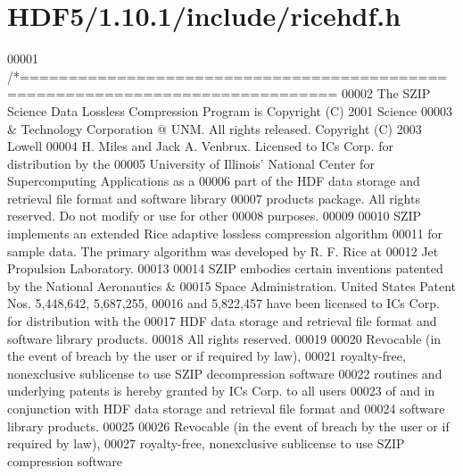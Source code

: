 \hypertarget{_h_d_f5_21_810_81_2include_2ricehdf_8h_source}{}\section{H\+D\+F5/1.10.1/include/ricehdf.h}
\label{_h_d_f5_21_810_81_2include_2ricehdf_8h_source}

\begin{DoxyCode}
00001 \textcolor{comment}{/*==============================================================================}
00002 \textcolor{comment}{The SZIP Science Data Lossless Compression Program is Copyright (C) 2001 Science}
00003 \textcolor{comment}{& Technology Corporation @ UNM.  All rights released.  Copyright (C) 2003 Lowell}
00004 \textcolor{comment}{H. Miles and Jack A. Venbrux.  Licensed to ICs Corp. for distribution by the}
00005 \textcolor{comment}{University of Illinois' National Center for Supercomputing Applications as a}
00006 \textcolor{comment}{part of the HDF data storage and retrieval file format and software library}
00007 \textcolor{comment}{products package.  All rights reserved.  Do not modify or use for other}
00008 \textcolor{comment}{purposes.}
00009 \textcolor{comment}{}
00010 \textcolor{comment}{SZIP implements an extended Rice adaptive lossless compression algorithm}
00011 \textcolor{comment}{for sample data.  The primary algorithm was developed by R. F. Rice at}
00012 \textcolor{comment}{Jet Propulsion Laboratory.  }
00013 \textcolor{comment}{}
00014 \textcolor{comment}{SZIP embodies certain inventions patented by the National Aeronautics &}
00015 \textcolor{comment}{Space Administration.  United States Patent Nos. 5,448,642, 5,687,255,}
00016 \textcolor{comment}{and 5,822,457 have been licensed to ICs Corp. for distribution with the}
00017 \textcolor{comment}{HDF data storage and retrieval file format and software library products.}
00018 \textcolor{comment}{All rights reserved.}
00019 \textcolor{comment}{}
00020 \textcolor{comment}{Revocable (in the event of breach by the user or if required by law), }
00021 \textcolor{comment}{royalty-free, nonexclusive sublicense to use SZIP decompression software }
00022 \textcolor{comment}{routines and underlying patents is hereby granted by ICs Corp. to all users }
00023 \textcolor{comment}{of and in conjunction with HDF data storage and retrieval file format and }
00024 \textcolor{comment}{software library products.}
00025 \textcolor{comment}{}
00026 \textcolor{comment}{Revocable (in the event of breach by the user or if required by law), }
00027 \textcolor{comment}{royalty-free, nonexclusive sublicense to use SZIP compression software }

\end{DoxyCode}
